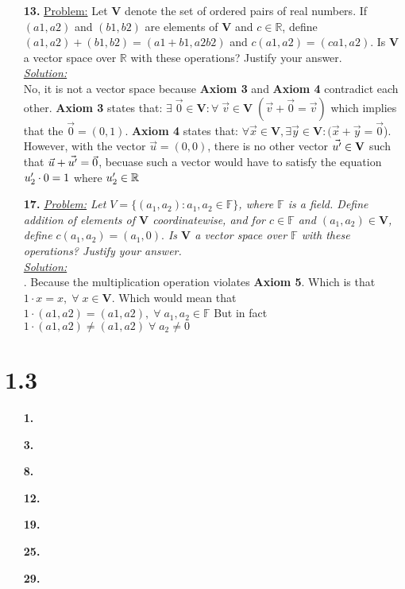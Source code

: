 \documentclass[11pt, fleqn]{article}
\newcommand{\vectSpace}[0]{\mathbf{V}}
\begin{document}
\begin{itemize}
    \item [\textbf{13.}]
    {\underline{Problem:} Let $\mathbf{V}$ denote the set of ordered pairs of real numbers. If $(a1,a2)$ and $(b1, b2)$ are elements of $\mathbf{V}$ and $c \in \mathbb{R}$, define $(a1, a2) + (b1,b2) = (a1 + b1, a2b2)$ and $c(a1,a2) = (ca1,a2)$. Is $\mathbf{V}$ a vector space over $\mathbb{R}$ with these operations? Justify your answer.}\\[2ex]\textit{\underline{Solution:}}\\
    	No, it is not a vector space because \textbf{Axiom 3} and \textbf{Axiom 4} contradict each other. \textbf{Axiom 3} states that: $\exists\;\vec{0} \in \vectSpace : \forall \; \vec{v} \in \vectSpace \;(\vec{v} + \vec{0} = \vec{v})$ which implies that the $\vec{0} = (0, 1)$. \textbf{Axiom 4} states that: $\forall\vec{x} \in \vectSpace, \exists \vec{y} \in \vectSpace : (\vec{x}  + \vec{y}  = \vec{0}$). However, with the vector $\vec{u} = (0, 0)$, there is no other vector $\vec{u\rq} \in \vectSpace$ such that $\vec{u} + \vec{u\rq} = \vec{0}$, becuase such a vector would have to satisfy the equation $u\rq_2 \cdot 0 = 1$ where $u\rq_2 \in \mathbb{R}$
    
    \item [\textbf{17.}]
    \textit{\underline{Problem:} Let $V = \{(a_1,a_2): a_1,a_2 \in \mathbb{F}\}$, where $\mathbb{F}$ is a field. Define addition of elements of $\vectSpace$ coordinatewise, and for $c \in \mathbb{F}$ and $(a_1, a_2) \in \vectSpace$, define $c(a_1,a_2) = (a_1, 0).$ Is $\vectSpace$ a vector space over $\mathbb{F}$ with these operations? Justify your answer.}\\[2ex]\textit{\underline{Solution:}}\\
    	. Because the multiplication operation violates \textbf{Axiom 5}. Which is that $1\cdot x = x,\;\forall\;x\in\vectSpace$. Which would mean that $1\cdot(a1,a2) = (a1,a2), \;\forall \;a_1,a_2 \in \mathbb{F}$ But in fact  $1\cdot(a1,a2) \neq (a1,a2) \;\forall\; a_2 \neq 0$
\end{itemize}

\section*{1.3}
\begin{itemize}
    \setlength\itemsep{5ex}
    \item [\textbf{1.}]
    	
    \item [\textbf{3.}]
    \item [\textbf{8.}]
    \item [\textbf{12.}]
    \item [\textbf{19.}]
    \item [\textbf{25.}]
    \item [\textbf{29.}]
\end{itemize}
\end{document}
